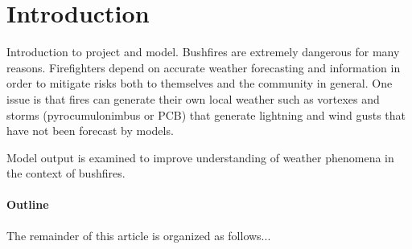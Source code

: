 \section{Introduction} 
  \label{intro}

  Introduction to project and model.
  Bushfires are extremely dangerous for many reasons. 
  Firefighters depend on accurate weather forecasting and information in order to mitigate risks both to themselves and the community in general.
  One issue is that fires can generate their own local weather such as vortexes \cite{Forthofer2011} and storms (pyrocumulonimbus or PCB) \cite{Peace2017} that generate lightning and wind gusts that have not been forecast by models.
  
  Model output is examined to improve understanding of weather phenomena in the context of bushfires. 

  \paragraph{Outline}
    The remainder of this article is organized as follows...
